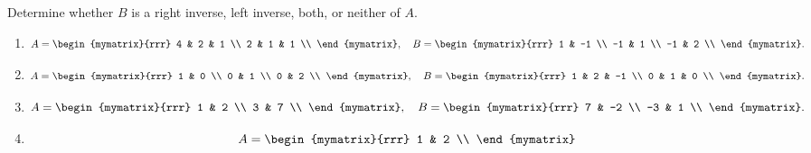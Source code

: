 \begin{ex}
  Determine whether $B$ is a right inverse, left inverse, both, or
  neither of $A$.
  \begin{enumerate}
  \item
    \begin{equation*}
      A = \begin{mymatrix}{rrr}
        4 & 2 & 1 \\
        2 & 1 & 1 \\
      \end{mymatrix},
      \quad
      B = \begin{mymatrix}{rrr}
        1 & -1 \\
        -1 & 1 \\
        -1 & 2 \\
      \end{mymatrix}.
    \end{equation*}
  \item
    \begin{equation*}
      A = \begin{mymatrix}{rrr}
        1 & 0 \\
        0 & 1 \\
        0 & 2 \\
      \end{mymatrix},
      \quad
      B = \begin{mymatrix}{rrr}
        1 & 2 & -1 \\
        0 & 1 & 0 \\
      \end{mymatrix}.
    \end{equation*}
  \item
    \begin{equation*}
      A = \begin{mymatrix}{rrr}
        1 & 2 \\
        3 & 7 \\
      \end{mymatrix},
      \quad
      B = \begin{mymatrix}{rrr}
        7 & -2 \\
        -3 & 1 \\
      \end{mymatrix}.
    \end{equation*}
  \item
    \begin{equation*}
      A = \begin{mymatrix}{rrr}
        1 & 2 \\

\end{mymatrix}
\end{equation*}
\end{enumerate}
\end{ex}
